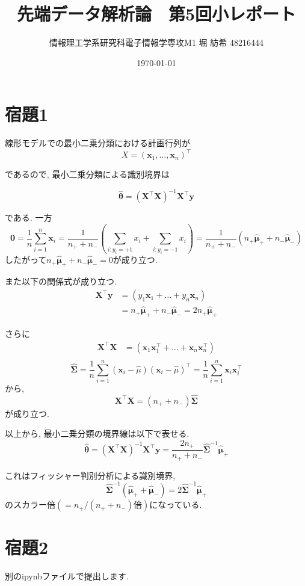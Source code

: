 \documentclass[a4paper,11pt]{jsarticle}
\begin{document}
  \title{先端データ解析論　第5回小レポート}
  \author{情報理工学系研究科電子情報学専攻M1 堀 紡希 48216444}
  \date{\today}
  \maketitle

  \section*{宿題1}
  線形モデルでの最小二乗分類における計画行列が
  \[X = \left( {\bm x}_1, \dots, {\bm x}_n \right) ^\top \]

  であるので, 最小二乗分類による識別境界は

  \[ \hat{\bm \theta} = ({\bm X}^\top {\bm X})^{-1} {\bm X}^{\top} {\bm y}  \]

  である.
  一方
  \[ {\bm 0} = \frac{1}{n} \sum _{i=1} ^n {\bm x}_i 
  = \frac{1}{n_+ + n_-}\left(\sum _{i:y_i=+1} x_i + \sum _{i:y_i=-1} x_i\right)
  = \frac{1}{n_+ + n_-}(n_+ \hat{\bm \mu}_+ + n_- \hat{\bm \mu}_- )
  \]
  したがって$n_+ \hat{\bm \mu}_+ + n_- \hat{\bm \mu}_- = 0$が成り立つ.

  また以下の関係式が成り立つ.
  \begin{align*}
     {\bm X}^\top{\bm y} &= (y_1 {\bm x}_1 + \dots + y_n {\bm x}_n)\\
     &= n_+\hat{\bm \mu}_+ + n_-\hat{\bm \mu}_- = 2n_+\hat{\bm \mu}_+
  \end{align*}

  さらに
  \begin{align*}
    {\bm X}^\top {\bm X} &= ({\bm x}_1 {\bm x}_1^\top + \dots + {\bm x}_n {\bm x}_n^\top)\\
  \end{align*}
  \[ \hat{\bm \Sigma} = \frac{1}{n} \sum _{i=1}^n ({\bm x}_i - \hat{\mu})({\bm x}_i - \hat{\mu})^\top = \frac{1}{n} \sum _{i=1}^n {\bm x}_i {\bm x}_i ^\top\]
  から, 
  \[ {\bm X}^\top {\bm X} = (n_+ + n_-) \hat{\bm \Sigma} \]
  が成り立つ.

  以上から, 最小二乗分類の境界線は以下で表せる.
  \[\hat{\bm \theta} = ({\bm X}^\top {\bm X})^{-1} {\bm X}^{\top} {\bm y} = \frac{2n_+}{n_+ + n_-} \hat{\bm \Sigma}^{-1} \hat{\bm \mu}_+ \]
  
  これはフィッシャー判別分析による識別境界, 
  \[ \hat{\bm \Sigma}^{-1} (\hat{\bm \mu}_+ + \hat{\bm \mu}_-) = 2\hat{\bm \Sigma}^{-1} \hat{\bm \mu}_+\]
  のスカラー倍$(=n_+ / (n_+ + n_-) \text{倍})$になっている.
  \section*{宿題2}
  別のipynbファイルで提出します.
\end{document}
